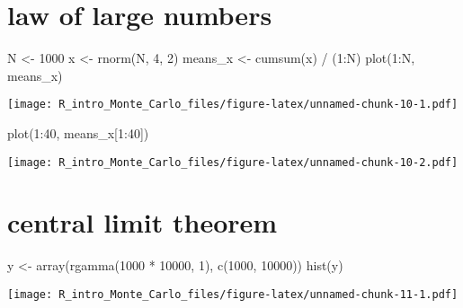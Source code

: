 \documentclass[
]{article}
\newenvironment{Shaded}{\begin{snugshade}}{\end{snugshade}}
\newcommand{\DecValTok}[1]{\textcolor[rgb]{0.00,0.00,0.81}{#1}}
\newcommand{\FunctionTok}[1]{\textcolor[rgb]{0.00,0.00,0.00}{#1}}
\newcommand{\NormalTok}[1]{#1}
\newcommand{\OtherTok}[1]{\textcolor[rgb]{0.56,0.35,0.01}{#1}}
\newcommand{\SpecialCharTok}[1]{\textcolor[rgb]{0.00,0.00,0.00}{#1}}
\begin{document}
\hypertarget{law-of-large-numbers}{%
\section{law of large numbers}\label{law-of-large-numbers}}

\begin{Shaded}
\begin{Highlighting}[]
\NormalTok{N }\OtherTok{\textless{}{-}} \DecValTok{1000}
\NormalTok{x }\OtherTok{\textless{}{-}} \FunctionTok{rnorm}\NormalTok{(N, }\DecValTok{4}\NormalTok{, }\DecValTok{2}\NormalTok{)}
\NormalTok{means\_x }\OtherTok{\textless{}{-}} \FunctionTok{cumsum}\NormalTok{(x) }\SpecialCharTok{/}\NormalTok{ (}\DecValTok{1}\SpecialCharTok{:}\NormalTok{N)}
\FunctionTok{plot}\NormalTok{(}\DecValTok{1}\SpecialCharTok{:}\NormalTok{N, means\_x)}
\end{Highlighting}
\end{Shaded}

\texttt{[image: R\_intro\_Monte\_Carlo\_files/figure-latex/unnamed-chunk-10-1.pdf]}

\begin{Shaded}
\begin{Highlighting}[]
\FunctionTok{plot}\NormalTok{(}\DecValTok{1}\SpecialCharTok{:}\DecValTok{40}\NormalTok{, means\_x[}\DecValTok{1}\SpecialCharTok{:}\DecValTok{40}\NormalTok{])}
\end{Highlighting}
\end{Shaded}

\texttt{[image: R\_intro\_Monte\_Carlo\_files/figure-latex/unnamed-chunk-10-2.pdf]}

\hypertarget{central-limit-theorem}{%
\section{central limit theorem}\label{central-limit-theorem}}

\begin{Shaded}
\begin{Highlighting}[]
\NormalTok{y }\OtherTok{\textless{}{-}} \FunctionTok{array}\NormalTok{(}\FunctionTok{rgamma}\NormalTok{(}\DecValTok{1000} \SpecialCharTok{*} \DecValTok{10000}\NormalTok{, }\DecValTok{1}\NormalTok{), }\FunctionTok{c}\NormalTok{(}\DecValTok{1000}\NormalTok{, }\DecValTok{10000}\NormalTok{))}
\FunctionTok{hist}\NormalTok{(y)}
\end{Highlighting}
\end{Shaded}

\texttt{[image: R\_intro\_Monte\_Carlo\_files/figure-latex/unnamed-chunk-11-1.pdf]}
\end{document}
